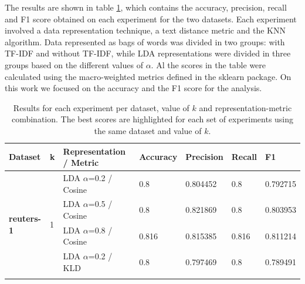 \documentclass[preprint,12pt,3p]{elsarticle}
\begin{document}
The results are shown in table \ref{table-results}, which contains the accuracy, precision, recall and F1 score obtained on each experiment for the two datasets. Each experiment involved a data representation technique, a text distance metric and the KNN algorithm. Data represented as bags of words was divided in two groups: with TF-IDF and without TF-IDF, while LDA representations were divided in three groups based on the different values of $\alpha$. Al the scores in the table were calculated using the macro-weighted metrics defined in the sklearn package. On this work we focused on the accuracy and the F1 score for the analysis.

\begin{table}[h]
\centering
\caption{Results for each experiment per dataset, value of $k$ and representation-metric combination. The best scores are highlighted for each set of experiments using the same dataset and value of $k$.}
\label{table-results}
{\tiny
\begin{tabular}{|l|l|l|l|l|l|l|}
\hline
 
{ \textbf{Dataset}}                 & { \textbf{k}} & { \textbf{Representation / Metric}}                           & { \textbf{Accuracy}} & { \textbf{Precision}} & { \textbf{Recall}} & { \textbf{F1}}       \\ \hline
 
\multirow{18}{*}{ \textbf{reuters-1}}                     & \multirow{9}{*}{ 1}         & LDA $\alpha$=0.2 / Cosine                                                              & { 0.8}                & { 0.804452}           & { 0.8}                   & { 0.792715}          \\ \cline{3-7}
					                  &                             & LDA $\alpha$=0.5 / Cosine                                                              & { 0.8}                & { 0.821869}           & { 0.8}                   & { 0.803953}          \\ \cline{3-7}
 
					                  &                             & LDA $\alpha$=0.8 / Cosine                                                              & { 0.816}              & { 0.815385}           & { 0.816}                 & { 0.811214}          \\ \cline{3-7}
					                  &                             & LDA $\alpha$=0.2 / KLD                                                      & { 0.8}                & { 0.797469}           & { 0.8}                   & { 0.789491}          \\ \cline{3-7}
 

\end{tabular}}
\end{table}
\end{document}
